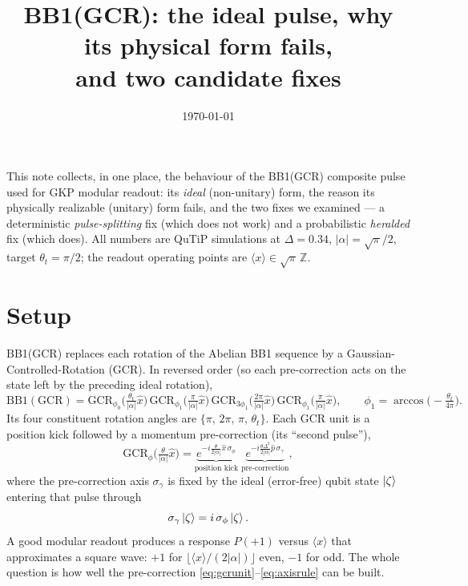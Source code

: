 \documentclass[11pt]{article}
\title{\textbf{BB1(GCR): the ideal pulse, why its physical form fails,\\ and two candidate fixes}}
\author{}
\date{\today}
\newcommand{\GCR}{\mathrm{GCR}}
\begin{document}
\maketitle

\noindent This note collects, in one place, the behaviour of the BB1(GCR) composite pulse used
for GKP modular readout: its \emph{ideal} (non-unitary) form, the reason its physically
realizable (unitary) form fails, and the two fixes we examined --- a deterministic
\emph{pulse-splitting} fix (which does not work) and a probabilistic \emph{heralded} fix (which
does). All numbers are QuTiP simulations at $\Delta=0.34$, $|\alpha|=\sqrt{\pi}/2$, target
$\theta_t=\pi/2$; the readout operating points are $\langle x\rangle\in\sqrt{\pi}\,\mathbb{Z}$.

\section{Setup}
BB1(GCR) replaces each rotation of the Abelian BB1 sequence by a Gaussian-Controlled-Rotation
(GCR). In reversed order (so each pre-correction acts on the state left by the preceding ideal
rotation),
\begin{equation}
\mathrm{BB1(GCR)}=
\GCR_{\phi_0}\!\Big(\tfrac{\theta_t}{|\alpha|}\hat x\Big)\,
\GCR_{\phi_1}\!\Big(\tfrac{\pi}{|\alpha|}\hat x\Big)\,
\GCR_{3\phi_1}\!\Big(\tfrac{2\pi}{|\alpha|}\hat x\Big)\,
\GCR_{\phi_1}\!\Big(\tfrac{\pi}{|\alpha|}\hat x\Big),\qquad
\phi_1=\arccos\!\big(-\tfrac{\theta_t}{4\pi}\big).
\label{eq:bb1gcr}
\end{equation}
Its four constituent rotation angles are $\{\pi,\,2\pi,\,\pi,\,\theta_t\}$. Each GCR unit is a
position kick followed by a momentum pre-correction (its ``second pulse''),
\begin{equation}
\GCR_\phi\!\Big(\tfrac{\theta}{|\alpha|}\hat x\Big)
= \underbrace{e^{-i\frac{\theta}{2|\alpha|}\hat x\,\sigma_\phi}}_{\text{position kick}}\;
  \underbrace{e^{-i\frac{\theta\Delta^2}{2|\alpha|}\hat p\,\sigma_\gamma}}_{\text{pre-correction}},
\label{eq:gcrunit}
\end{equation}
where the pre-correction axis $\sigma_\gamma$ is fixed by the ideal (error-free) qubit state
$\ket{\zeta}$ entering that pulse through
\begin{equation}
\sigma_\gamma\ket{\zeta}=i\,\sigma_\phi\ket{\zeta}.
\label{eq:axisrule}
\end{equation}
A good modular readout produces a response $P(+1)$ versus $\langle x\rangle$ that approximates a
square wave: $+1$ for $\lfloor\langle x\rangle/(2|\alpha|)\rfloor$ even, $-1$ for odd. The whole
question is how well the pre-correction \eqref{eq:gcrunit}--\eqref{eq:axisrule} can be built.
\end{document}
